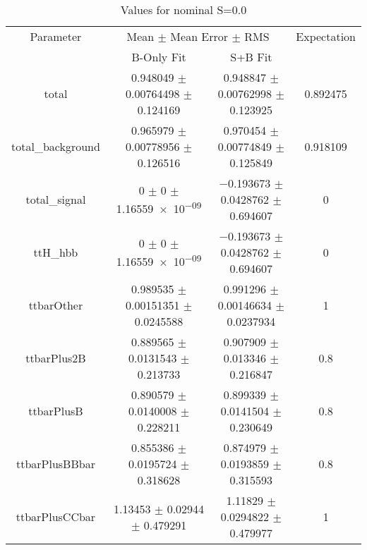 \begin{table}
\centering
\caption{Values for nominal S=0.0}
\begin{tabular}{cccc}
\toprule
Parameter & \multicolumn{2}{c}{Mean $\pm$ Mean Error $\pm$ RMS} & Expectation\\
 & B-Only Fit & S+B Fit & \\
\midrule
total & \num{0.948049} $\pm$ \num{0.00764498} $\pm$ \num{0.124169} & \num{0.948847} $\pm$ \num{0.00762998} $\pm$ \num{0.123925} & \num{0.892475}\\
total\_background & \num{0.965979} $\pm$ \num{0.00778956} $\pm$ \num{0.126516} & \num{0.970454} $\pm$ \num{0.00774849} $\pm$ \num{0.125849} & \num{0.918109}\\
total\_signal & \num{0} $\pm$ \num{0} $\pm$ \num{1.16559e-09} & \num{-0.193673} $\pm$ \num{0.0428762} $\pm$ \num{0.694607} & \num{0}\\
ttH\_hbb & \num{0} $\pm$ \num{0} $\pm$ \num{1.16559e-09} & \num{-0.193673} $\pm$ \num{0.0428762} $\pm$ \num{0.694607} & \num{0}\\
ttbarOther & \num{0.989535} $\pm$ \num{0.00151351} $\pm$ \num{0.0245588} & \num{0.991296} $\pm$ \num{0.00146634} $\pm$ \num{0.0237934} & \num{1}\\
ttbarPlus2B & \num{0.889565} $\pm$ \num{0.0131543} $\pm$ \num{0.213733} & \num{0.907909} $\pm$ \num{0.013346} $\pm$ \num{0.216847} & \num{0.8}\\
ttbarPlusB & \num{0.890579} $\pm$ \num{0.0140008} $\pm$ \num{0.228211} & \num{0.899339} $\pm$ \num{0.0141504} $\pm$ \num{0.230649} & \num{0.8}\\
ttbarPlusBBbar & \num{0.855386} $\pm$ \num{0.0195724} $\pm$ \num{0.318628} & \num{0.874979} $\pm$ \num{0.0193859} $\pm$ \num{0.315593} & \num{0.8}\\
ttbarPlusCCbar & \num{1.13453} $\pm$ \num{0.02944} $\pm$ \num{0.479291} & \num{1.11829} $\pm$ \num{0.0294822} $\pm$ \num{0.479977} & \num{1}\\
\bottomrule
\end{tabular}
\end{table}